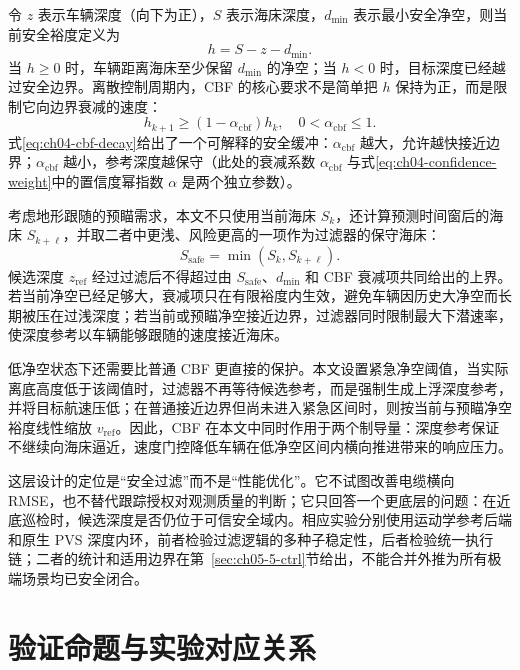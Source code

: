 令 \(z\) 表示车辆深度（向下为正），\(S\) 表示海床深度，\(d_{\min}\) 表示最小安全净空，则当前安全裕度定义为
\begin{equation}
  h = S - z - d_{\min}.
  \label{eq:ch04-cbf-margin}
\end{equation}
当 \(h\ge 0\) 时，车辆距离海床至少保留 \(d_{\min}\) 的净空；当 \(h<0\) 时，目标深度已经越过安全边界。离散控制周期内，CBF 的核心要求不是简单把 \(h\) 保持为正，而是限制它向边界衰减的速度：
\begin{equation}
  h_{k+1} \ge (1-\alpha_{\mathrm{cbf}}) h_k,\quad 0<\alpha_{\mathrm{cbf}}\le 1 .
  \label{eq:ch04-cbf-decay}
\end{equation}
式\eqref{eq:ch04-cbf-decay}给出了一个可解释的安全缓冲：\(\alpha_{\mathrm{cbf}}\) 越大，允许越快接近边界；\(\alpha_{\mathrm{cbf}}\) 越小，参考深度越保守（此处的衰减系数 \(\alpha_{\mathrm{cbf}}\) 与式\eqref{eq:ch04-confidence-weight}中的置信度幂指数 \(\alpha\) 是两个独立参数）。

考虑地形跟随的预瞄需求，本文不只使用当前海床 \(S_k\)，还计算预测时间窗后的海床 \(S_{k+\ell}\)，并取二者中更浅、风险更高的一项作为过滤器的保守海床：
\begin{equation}
  S_{\mathrm{safe}}=\min(S_k,S_{k+\ell}) .
  \label{eq:ch04-cbf-safe-floor}
\end{equation}
候选深度 \(z_{\mathrm{ref}}\) 经过过滤后不得超过由 \(S_{\mathrm{safe}}\)、\(d_{\min}\) 和 CBF 衰减项共同给出的上界。若当前净空已经足够大，衰减项只在有限裕度内生效，避免车辆因历史大净空而长期被压在过浅深度；若当前或预瞄净空接近边界，过滤器同时限制最大下潜速率，使深度参考以车辆能够跟随的速度接近海床。

低净空状态下还需要比普通 CBF 更直接的保护。本文设置紧急净空阈值，当实际离底高度低于该阈值时，过滤器不再等待候选参考，而是强制生成上浮深度参考，并将目标航速压低；在普通接近边界但尚未进入紧急区间时，则按当前与预瞄净空裕度线性缩放 \(v_{\mathrm{ref}}\)。因此，CBF 在本文中同时作用于两个制导量：深度参考保证不继续向海床逼近，速度门控降低车辆在低净空区间内横向推进带来的响应压力。

这层设计的定位是``安全过滤''而不是``性能优化''。它不试图改善电缆横向 RMSE，也不替代跟踪授权对观测质量的判断；它只回答一个更底层的问题：在近底巡检时，候选深度是否仍位于可信安全域内。相应实验分别使用运动学参考后端和原生 PVS 深度内环，前者检验过滤逻辑的多种子稳定性，后者检验统一执行链；二者的统计和适用边界在第~\ref{sec:ch05-5-ctrl}节给出，不能合并外推为所有极端场景均已安全闭合。

\section{验证命题与实验对应关系}\label{sec:ch04-4-5}


